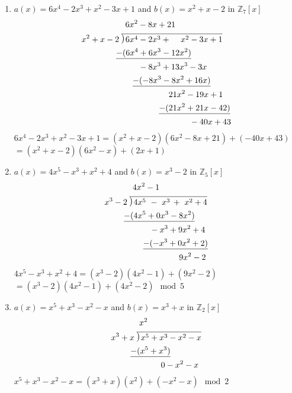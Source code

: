 \documentclass[12pt]{article}
\newcommand\Mydiv[2]{%
$\strut#1$\kern.25em\smash{\raise.3ex\hbox{$\big)$}}$\mkern-8mu
        \overline{\enspace\strut#2}$}
\begin{document}
\begin{enumerate}[label=\textbf{\arabic*}.]
\begin{enumerate}
		      \item $a(x) = 6x^4-2x^3+x^2-3x+1$ and $b(x) = x^2+x-2$ in $\mathbb{Z}_{7}[x]$
		            \begin{align*}
			             & \qquad \qquad \quad \; 6x^2-8x+21                               \\
			             & \text{\Mydiv{x^2+x-2}{6x^4-2x^3 + \ \quad \! x^2-3x+1}}         \\
			             & \qquad \qquad \, \underline{-(6x^4+6x^3-12x^2)}                 \\
			             & \qquad \qquad \qquad \; \; \; -8x^3+13x^3-3x                    \\
			             & \qquad \qquad \qquad \, \underline{-(-8x^3-8x^2+16x)}           \\
			             & \qquad \qquad \qquad \qquad \qquad \ \, 21x^2-19x+1             \\
			             & \qquad \qquad \qquad \qquad \quad \ \underline{-(21x^2+21x-42)} \\
			             & \qquad \qquad \qquad \qquad \qquad \qquad \quad -40x+43
		            \end{align*}
		            $6x^4-2x^3+x^2-3x+1 = (x^2+x-2)(6x^2-8x+21)+(-40x+43)$ \\
		            $=(x^2+x-2)(6x^2-x)+(2x+1)$

		      \item $a(x) = 4x^5-x^3+x^2+4$ and $b(x) = x^3-2$ in $\mathbb{Z}_{5}[x]$
		            \begin{align*}
			             & \qquad \quad \ \: \! 4x^2-1                       \\
			             & \text{\Mydiv{x^3-2}{4x^5 \ - \ x^3 \, + \ x^2+4}} \\
			             & \qquad \ \underline{-(4x^5+0x^3-8x^2)}            \\
			             & \qquad \qquad \quad \; \, -x^3+9x^2+4             \\
			             & \qquad \qquad \ \ \underline{-(-x^3+0x^2+2)}      \\
			             & \qquad \qquad \qquad \qquad \quad 9x^2-2
		            \end{align*}
		            $4x^5-x^3+x^2+4 = (x^3-2)(4x^2-1) + (9x^2-2)$ \\
		            $=(x^3-2)(4x^2-1)+(4x^2-2) \mod{5}$

		      \item $a(x) = x^5+x^3-x^2-x$ and $b(x) = x^3+x$ in $\mathbb{Z}_{2}[x]$
		            \begin{align*}
			             & \qquad \quad \ \: \! x^2            \\
			             & \text{\Mydiv{x^3+x}{x^5+x^3-x^2-x}} \\
			             & \qquad \ \underline{-(x^5+x^3)}     \\
			             & \qquad \qquad \qquad 0-x^2-x
		            \end{align*}
		            $x^5+x^3-x^2-x = (x^3+x)(x^2) + (-x^2-x) \mod{2}$
	      \end{enumerate}
          

\end{enumerate}
\end{document}
